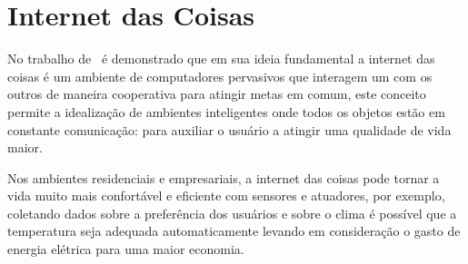 \section{Internet das Coisas}

No trabalho de~ é demonstrado que em sua ideia fundamental a internet das coisas é um ambiente de computadores pervasivos que interagem um com os outros de maneira cooperativa para atingir metas em comum, este conceito permite a idealização de ambientes inteligentes onde todos os objetos estão em constante comunicação: para auxiliar o usuário a atingir uma qualidade de vida maior.

Nos ambientes residenciais e empresariais, a internet das coisas pode tornar a vida muito mais confortável e eficiente com sensores e atuadores, por exemplo, coletando dados sobre a preferência dos usuários e sobre o clima é possível que a temperatura seja adequada automaticamente levando em consideração o gasto de energia elétrica para uma maior economia. \cite{ATZORI:2010}

% 

